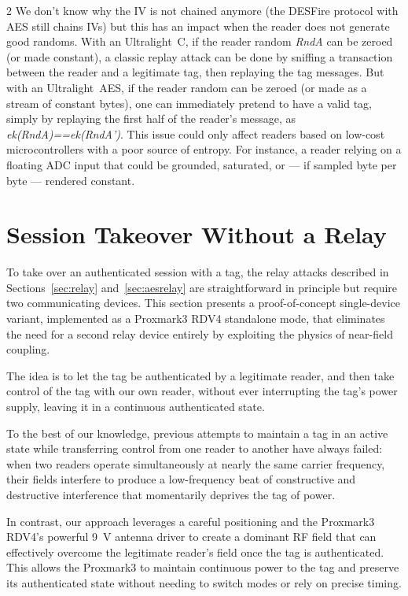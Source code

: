 \documentclass[10pt,letterpaper]{article}
\begin{document}
\begin{multicols}{2}
We don't know why the IV is not chained anymore (the DESFire protocol with AES still chains IVs) but this has an impact when the reader does not generate good randoms.
With an Ultralight~C, if the reader random \textit{RndA} can be zeroed (or made constant), a classic replay attack can be done by sniffing a transaction between the reader and a legitimate tag, then replaying the tag messages.
But with an Ultralight~AES, if the reader random can be zeroed (or made as a stream of constant bytes), one can immediately pretend to have a valid tag, simply by replaying the first half of the reader's message, as \textit{ek(RndA)==ek(RndA')}.
This issue could only affect readers based on low-cost microcontrollers with a poor source of entropy. For instance, a reader relying on a floating ADC input that could be grounded, saturated, or --- if sampled byte per byte --- rendered constant.

\section{Session Takeover Without a Relay}
\label{sec:norelay}

To take over an authenticated session with a tag, the relay attacks described in Sections~\ref{sec:relay} and~\ref{sec:aesrelay} are straightforward in principle but require two communicating devices. This section presents a proof-of-concept single-device variant, implemented as a Proxmark3 RDV4 standalone mode, that eliminates the need for a second relay device entirely by exploiting the physics of near-field coupling.

The idea is to let the tag be authenticated by a legitimate reader, and then take control of the tag with our own reader, without ever interrupting the tag's power supply, leaving it in a continuous authenticated state.

To the best of our knowledge, previous attempts to maintain a tag in an active state while transferring control from one reader to another have always failed: when two readers operate simultaneously at nearly the same carrier frequency, their fields interfere to produce a low-frequency beat of constructive and destructive interference that momentarily deprives the tag of power.

In contrast, our approach leverages a careful positioning and the Proxmark3 RDV4's powerful 9~V antenna driver to create a dominant RF field that can effectively overcome the legitimate reader's field once the tag is authenticated. This allows the Proxmark3 to maintain continuous power to the tag and preserve its authenticated state without needing to switch modes or rely on precise timing.


\end{multicols}
\end{document}
